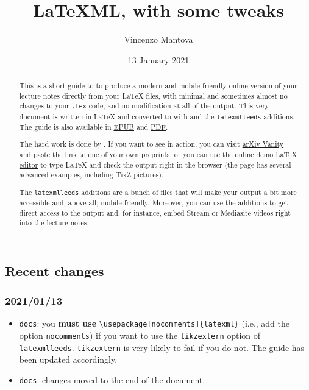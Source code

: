 \documentclass[a4paper]{article}
\title{LaTeXML, with some tweaks}
\author{Vincenzo Mantova}
\date{13 January 2021}
\def\ltxinline{\lstinline[style=latexml,frame=none]}
\theoremstyle{definition}
\begin{document}
\maketitle

\begin{abstract}
  This is a short guide to \LaTeXML{} to produce a modern and mobile friendly online version of your lecture notes directly from your \LaTeX{} files, with minimal and sometimes almost no changes to your \verb|.tex| code, and no modification at all of the \HTML{} output. This very document is written in \LaTeX{} and converted to \HTML{} with \LaTeXML{} and the \verb|latexmlleeds| additions. The guide is also available in \href{LaTeXML-Leeds.epub}{EPUB} and \href{LaTeXML-Leeds.pdf}{PDF}.

  The hard work is done by \LaTeXML{}. If you want to see \LaTeXML{} in action, you can visit \href{https://www.arxiv-vanity.com/}{arXiv Vanity} and paste the link to one of your own preprints, or you can use the online \href{https://latexml.mathweb.org/editor}{demo \LaTeX{} editor} to type \LaTeX{} and check the \HTML{} output right in the browser (the page has several advanced examples, including TikZ pictures).

  The \verb|latexmlleeds| additions are a bunch of files that will make your output a bit more accessible and, above all, mobile friendly. Moreover, you can use the additions to get direct access to the \HTML{} output and, for instance, embed Stream or Mediasite videos right into the lecture notes.
\end{abstract}

\subsection*{Recent changes}
\subsubsection*{2021/01/13}
\begin{itemize}
  \item \verb|docs|: you \textbf{must use} \ltxinline|\usepackage[nocomments]{latexml}| (i.e., add the option \verb|nocomments|) if you want to use the \verb|tikzextern| option of \verb|latexmlleeds|. \verb|tikzextern| is very likely to fail if you do not. The guide has been updated accordingly.
  \item \verb|docs|: changes moved to the end of the document.
\end{itemize}
\end{document}

